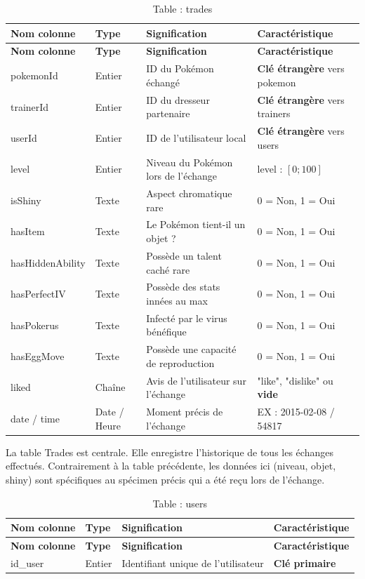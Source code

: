 \documentclass[mstat,12pt]{unswthesis}
\begin{document}
\begin{longtable}{|m{3.5cm}|m{1.5cm}|m{5cm}|m{5cm}|}
\caption{Table : trades} \label{tab:trades} \\
\hline
\textbf{Nom colonne} & \textbf{Type} & \textbf{Signification} & \textbf{Caractéristique} \\ \hline
\endfirsthead
\hline
\textbf{Nom colonne} & \textbf{Type} & \textbf{Signification} & \textbf{Caractéristique} \\ \hline
\endhead
pokemonId & Entier & ID du Pokémon échangé & \textbf{Clé étrangère} vers pokemon \\ \hline
trainerId & Entier & ID du dresseur partenaire & \textbf{Clé étrangère} vers trainers \\ \hline
userId & Entier & ID de l'utilisateur local & \textbf{Clé étrangère} vers users \\ \hline
level & Entier & Niveau du Pokémon lors de l'échange & level : $[0 ;100]$  \\ \hline
isShiny & Texte & Aspect chromatique rare & 0 = Non, 1 = Oui \\ \hline
hasItem & Texte & Le Pokémon tient-il un objet ? & 0 = Non, 1 = Oui \\ \hline
hasHiddenAbility & Texte & Possède un talent caché rare & 0 = Non, 1 = Oui \\ \hline
hasPerfectIV & Texte & Possède des stats innées au max & 0 = Non, 1 = Oui \\ \hline
hasPokerus & Texte & Infecté par le virus bénéfique & 0 = Non, 1 = Oui \\ \hline
hasEggMove & Texte & Possède une capacité de reproduction & 0 = Non, 1 = Oui \\ \hline
liked & Chaîne & Avis de l'utilisateur sur l'échange & "like", "dislike" ou \textbf{vide} \\ \hline
date / time & Date / Heure & Moment précis de l'échange & EX : 2015-02-08 / 54817 \\ \hline
\end{longtable}

\smallskip

La table Trades est centrale. Elle enregistre l'historique de tous les
échanges effectués. Contrairement à la table précédente, les données ici
(niveau, objet, shiny) sont spécifiques au spécimen précis qui a été
reçu lors de l'échange.

\bigskip

\begin{longtable}{|m{3.5cm}|m{1.5cm}|m{5cm}|m{5cm}|}
\caption{Table : users} \label{tab:users} \\
\hline
\textbf{Nom colonne} & \textbf{Type} & \textbf{Signification} & \textbf{Caractéristique} \\ \hline
\endfirsthead
\hline
\textbf{Nom colonne} & \textbf{Type} & \textbf{Signification} & \textbf{Caractéristique} \\ \hline
\endhead
id\_user & Entier & Identifiant unique de l'utilisateur & \textbf{Clé primaire} \\ \hline
\end{longtable}
\end{document}
